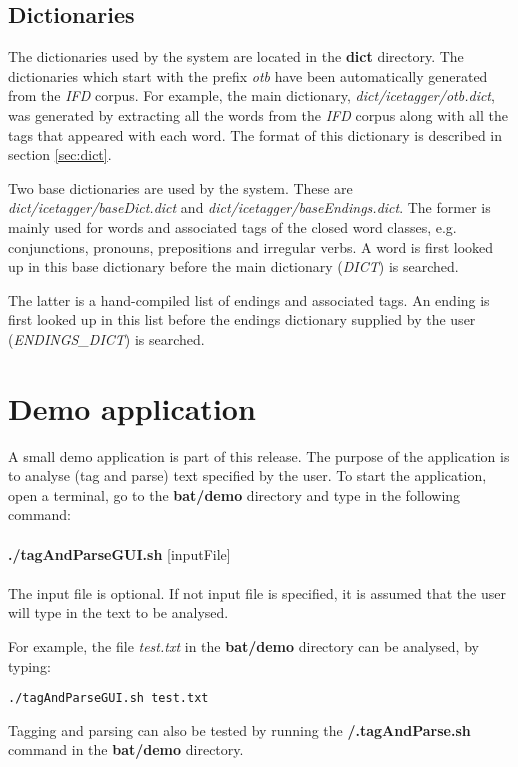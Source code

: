 \documentclass[11pt]{article}
\begin{document}
\subsection{Dictionaries}
The dictionaries used by the system are located in the \textbf{dict} directory.
The dictionaries which start with the prefix \emph{otb} have been automatically generated from the \emph{IFD} corpus.
For example, the main dictionary, \emph{dict/icetagger/otb.dict}, was generated by extracting all the words from the \emph{IFD} corpus along with all the tags that appeared with each word.
The format of this dictionary is described in section \ref{sec:dict}.

Two base dictionaries are used by the system.
These are \emph{dict/icetagger/baseDict.dict} and \emph{dict/icetagger/baseEndings.dict}.
The former is mainly used for words and associated tags of the closed word classes, e.g. conjunctions, pronouns, prepositions and irregular verbs.
A word is first looked up in this base dictionary before the main dictionary (\emph{DICT}) is searched.

The latter is a hand-compiled list of endings and associated tags.
An ending is first looked up in this list before the endings dictionary supplied by the user (\emph{ENDINGS\_DICT}) is searched.

\section{Demo application}
\label{sec:demo}
A small demo application is part of this release.
The purpose of the application is to analyse (tag and parse) text specified by the user.
To start the application, open a terminal, go to the \textbf{bat/demo} directory and type in the following command:\\ \\

{\bf ./tagAndParseGUI.sh} [inputFile]  \\ \\

The input file is optional.
If not input file is specified, it is assumed that the user will type in the text to be analysed.

For example, the file \emph{test.txt} in the \textbf{bat/demo} directory can be analysed, by typing:
\begin{verbatim}
./tagAndParseGUI.sh test.txt
\end{verbatim}

Tagging and parsing can also be tested by running the \textbf{/.tagAndParse.sh} command in the \textbf{bat/demo} directory.  
\end{document}
